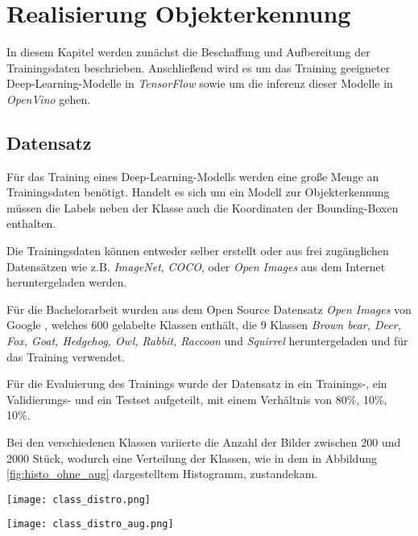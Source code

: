 \chapter{Realisierung Objekterkennung}\label{kap:object_det}

In diesem Kapitel werden zunächst die Beschaffung und Aufbereitung 
der Trainingsdaten beschrieben. Anschließend wird es um das 
Training geeigneter Deep-Learning-Modelle in \textit{TensorFlow}
 sowie um die \Gls{inferenz} dieser Modelle in \textit{OpenVino} gehen.

\section{Datensatz}\label{sec:dataset}

Für das Training eines Deep-Learning-Modells werden 
eine große Menge an Trainingsdaten benötigt.
Handelt es sich um ein Modell zur Objekterkennung
müssen die Labels neben der Klasse auch die Koordinaten 
der Bounding-Boxen enthalten.

Die Trainingsdaten können entweder selber erstellt oder 
aus frei zugänglichen Datensätzen wie z.B. \textit{ImageNet}, 
\textit{COCO}, oder \textit{Open Images}
aus dem Internet heruntergeladen werden.

Für die Bachelorarbeit wurden aus dem Open Source Datensatz
\textit{Open Images} von Google
\cite{kuznetsovaOpenImagesDataset2018}, 
welches 600 gelabelte Klassen enthält, 
die 9 Klassen \textit{Brown bear, Deer, Fox, Goat, 
Hedgehog, Owl, Rabbit, Raccoon} und \textit{Squirrel}
heruntergeladen und für das Training verwendet.

Für die Evaluierung des Trainings wurde der 
Datensatz in ein Trainings-, ein Validierungs- und ein 
Testset aufgeteilt, mit einem Verhältnis von 80\%, 10\%, 10\%.

Bei den verschiedenen Klassen variierte die Anzahl der 
Bilder zwischen 200 und 
2000 Stück, wodurch eine Verteilung der Klassen, 
wie in dem in Abbildung \ref{fig:histo_ohne_aug} dargestelltem
Histogramm, zustandekam.

\vspace{1cm}
\begin{minipage}{0.5\textwidth}
    \centering
    \texttt{[image: class\_distro.png]}
    \label{fig:histo_ohne_aug}
\end{minipage}
\begin{minipage}{0.5\textwidth}
    \centering
    \texttt{[image: class\_distro\_aug.png]}
    \label{fig:histo_mit_aug}
\end{minipage}
\vspace{1cm}

